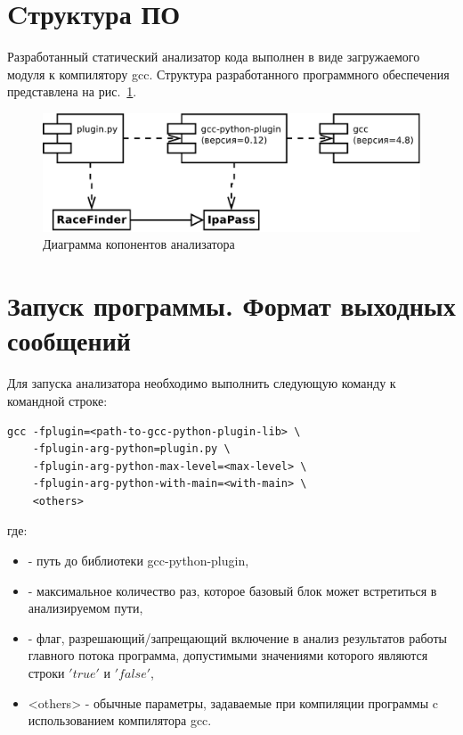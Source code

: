 \section{Cтруктура ПО}

Разработанный статический анализатор кода выполнен в виде загружаемого модуля к компилятору gcc. Структура разработанного программного обеспечения представлена на рис.~\ref{fig:components}.

\begin{figure}
  \centering
  \includegraphics[width=\textwidth]{inc/dia/components}
  \caption{Диаграмма копонентов анализатора}
  \label{fig:components}
\end{figure}

\section{Запуск программы. Формат выходных сообщений}

Для запуска анализатора необходимо выполнить следующую команду к командной строке:
\begin{verbatim}
gcc -fplugin=<path-to-gcc-python-plugin-lib> \
    -fplugin-arg-python=plugin.py \
    -fplugin-arg-python-max-level=<max-level> \
    -fplugin-arg-python-with-main=<with-main> \
    <others>
\end{verbatim}
где:
\begin{itemize}
  \item <path-to-gcc-python-plugin-lib> - путь до библиотеки gcc-python-plugin,
  \item <max-level> - максимальное количество раз, которое базовый блок может встретиться в анализируемом пути,
  \item <with-main> - флаг, разрешающий/запрещающий включение в анализ результатов работы главного потока программа, допустимыми значениями которого являются строки $'true'$ и $'false'$,
  \item <others> - обычные параметры, задаваемые при компиляции программы c использованием компилятора gcc.
\end{itemize}

